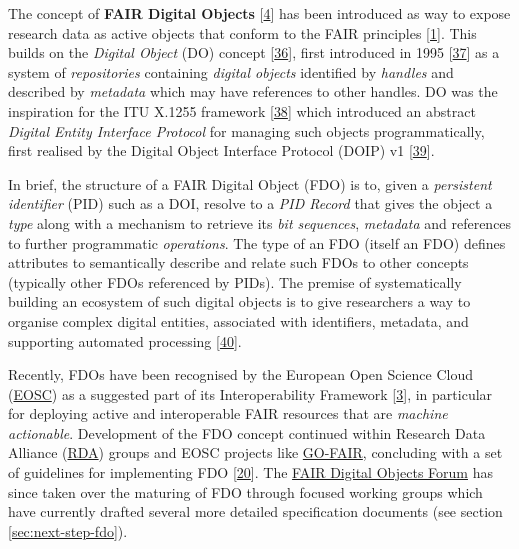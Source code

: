 The concept of \textbf{FAIR Digital Objects} {[}\protect\hyperlink{ref-IHLT6hye}{4}{]} has been introduced as way to expose research data as active objects that conform to the FAIR principles {[}\protect\hyperlink{ref-6DjakjNS}{1}{]}. This builds on the \emph{Digital Object} (DO) concept {[}\protect\hyperlink{ref-11MnuwJ4l}{36}{]}, first introduced in 1995 {[}\protect\hyperlink{ref-3Uqe3fuK}{37}{]} as a system of \emph{repositories} containing \emph{digital objects} identified by \emph{handles} and described by \emph{metadata} which may have references to other handles. DO was the inspiration for the ITU X.1255 framework {[}\protect\hyperlink{ref-103Hw8H43}{38}{]} which introduced an abstract \emph{Digital Entity Interface Protocol} for managing such objects programmatically, first realised by the Digital Object Interface Protocol (DOIP) v1 {[}\protect\hyperlink{ref-16uB3jxpa}{39}{]}.

In brief, the structure of a FAIR Digital Object (FDO) is to, given a \emph{persistent identifier} (PID) such as a DOI, resolve to a \emph{PID Record} that gives the object a \emph{type} along with a mechanism to retrieve its \emph{bit sequences}, \emph{metadata} and references to further programmatic \emph{operations}. The type of an FDO (itself an FDO) defines attributes to semantically describe and relate such FDOs to other concepts (typically other FDOs referenced by PIDs). The premise of systematically building an ecosystem of such digital objects is to give researchers a way to organise complex digital entities, associated with identifiers, metadata, and supporting automated processing {[}\protect\hyperlink{ref-tz0P3DTC}{40}{]}.

Recently, FDOs have been recognised by the European Open Science Cloud (\href{https://eosc.eu/}{EOSC}) as a suggested part of its Interoperability Framework {[}\protect\hyperlink{ref-aCye3KpE}{3}{]}, in particular for deploying active and interoperable FAIR resources that are \emph{machine actionable}. Development of the FDO concept continued within Research Data Alliance (\href{https://www.rd-alliance.org/}{RDA}) groups and EOSC projects like \href{https://www.go-fair.org/}{GO-FAIR}, concluding with a set of guidelines for implementing FDO {[}\protect\hyperlink{ref-RwvirqWg}{20}{]}. The \href{https://fairdo.org/}{FAIR Digital Objects Forum} has since taken over the maturing of FDO through focused working groups which have currently drafted several more detailed specification documents (see section \ref{sec:next-step-fdo}).

